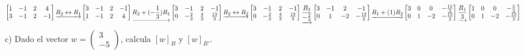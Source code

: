 \documentclass[
  11,
]{article}
\begin{document}
\[
  \left[\begin{matrix}1 & -1 & 2 & 4\\3 & -1 & 2 & -1\end{matrix}\right]
\underrightarrow{ R_{2} \leftrightarrow R_{1} }
\left[\begin{matrix}3 & -1 & 2 & -1\\1 & -1 & 2 & 4\end{matrix}\right]
\underrightarrow{ R_2 + (- \frac{1}{3})R_1 }
\left[\begin{matrix}3 & -1 & 2 & -1\\0 & - \frac{2}{3} & \frac{4}{3} & \frac{13}{3}\end{matrix}\right]
\underrightarrow{ R_{2} \leftrightarrow R_{2} }
\left[\begin{matrix}3 & -1 & 2 & -1\\0 & - \frac{2}{3} & \frac{4}{3} & \frac{13}{3}\end{matrix}\right]
\underrightarrow{ \frac{R_2}{- \frac{2}{3}} }
\left[\begin{matrix}3 & -1 & 2 & -1\\0 & 1 & -2 & - \frac{13}{2}\end{matrix}\right]
\underrightarrow{ R_1 + (1)R_2 }
\\
\left[\begin{matrix}3 & 0 & 0 & - \frac{15}{2}\\0 & 1 & -2 & - \frac{13}{2}\end{matrix}\right]
\underrightarrow{ \frac{R_1}{3} }
\left[\begin{matrix}1 & 0 & 0 & - \frac{5}{2}\\0 & 1 & -2 & - \frac{13}{2}\end{matrix}\right]
\] c) Dado el vector \(w = \begin{pmatrix}3\\-5\end{pmatrix}\), calcula
\([w]_B\) y \([w]_{B'}\).
\end{document}
